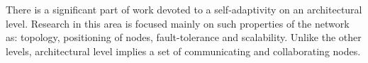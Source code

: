 There is a significant part of work devoted to a self-adaptivity on an
architectural level. Research in this area is focused mainly on such
properties of the network as: topology, positioning of nodes, fault-tolerance
and scalability. Unlike the other levels, architectural level implies a set of
communicating and collaborating nodes.



